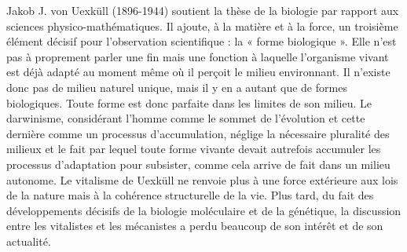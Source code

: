 Jakob J. von Uexküll (1896-1944) soutient la thèse de la biologie par rapport
aux sciences physico-mathématiques. Il
ajoute, à la matière et à la force, un troisième élément décisif pour l’observation
scientifique : la « forme biologique ». Elle
n’est pas à proprement parler une fin mais
une fonction à laquelle l'organisme vivant
est déjà adapté au moment même où il
perçoit le milieu environnant. Il n’existe
donc pas de milieu naturel unique, mais il
y en a autant que de formes biologiques.
Toute forme est donc parfaite dans les
limites de son milieu. Le darwinisme,
considérant l’homme comme le sommet
de l’évolution et cette dernière comme un
processus d’accumulation, néglige la
nécessaire pluralité des milieux et le fait
par lequel toute forme vivante devait
autrefois accumuler les processus d’adaptation pour subsister, comme cela arrive
de fait dans un milieu autonome. Le vitalisme de Uexküll ne renvoie plus à une
force extérieure aux lois de la nature mais
à la cohérence structurelle de la vie. Plus
tard, du fait des développements décisifs
de la biologie moléculaire et de la génétique, la discussion entre les vitalistes et
les mécanistes a perdu beaucoup de son
intérêt et de son actualité.
